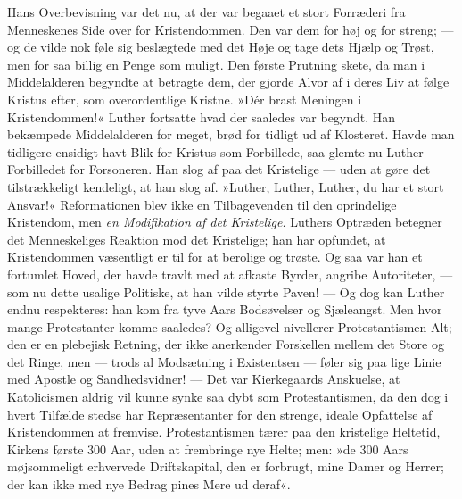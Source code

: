 \documentclass[12pt,a4paper,openany]{book}
\newcommand{\opage}[1]{\marginnote{\footnotesize\textit{[#1]}}}
\begin{document}
Hans Overbevisning var det nu, at der var begaaet
et stort Forræderi fra Menneskenes Side over for Kristendommen.
Den var dem for høj og for streng; --- og de
vilde nok føle sig beslægtede med det Høje og tage dets
Hjælp og Trøst, men for saa billig en Penge som muligt.
Den første Prutning skete, da man i Middelalderen begyndte
at betragte dem, der gjorde Alvor af i deres Liv
at følge Kristus efter, som overordentlige Kristne. »Dér
\opage{139}brast Meningen i Kristendommen!« Luther fortsatte hvad
der saaledes var begyndt. Han bekæmpede Middelalderen
for meget, brød for tidligt ud af Klosteret. Havde man
tidligere ensidigt havt Blik for Kristus som Forbillede,
saa glemte nu Luther Forbilledet for Forsoneren. Han
slog af paa det Kristelige --- uden at gøre det tilstrækkeligt
kendeligt, at han slog af. »Luther, Luther, Luther,
du har et stort Ansvar!« Reformationen blev ikke en
Tilbagevenden til den oprindelige Kristendom, men \textit{en
Modifikation af det Kristelige.} Luthers Optræden betegner
det Menneskeliges Reaktion mod det Kristelige; han har
opfundet, at Kristendommen væsentligt er til for at berolige
og trøste. Og saa var han et fortumlet Hoved,
der havde travlt med at afkaste Byrder, angribe Autoriteter,
--- som nu dette usalige Politiske, at han vilde
styrte Paven! --- Og dog kan Luther endnu respekteres:
han kom fra tyve Aars Bodsøvelser og Sjæleangst. Men
hvor mange Protestanter komme saaledes? Og alligevel
nivellerer Protestantismen Alt; den er en plebejisk Retning,
der ikke anerkender Forskellen mellem det Store
og det Ringe, men --- trods al Modsætning i Existentsen ---
føler sig paa lige Linie med Apostle og Sandhedsvidner! ---
Det var Kierkegaards Anskuelse, at Katolicismen aldrig
vil kunne synke saa dybt som Protestantismen, da den
dog i hvert Tilfælde stedse har Repræsentanter for den
strenge, ideale Opfattelse af Kristendommen at fremvise.
Protestantismen tærer paa den kristelige Heltetid, Kirkens
første 300 Aar, uden at frembringe nye Helte; men:
»de 300 Aars møjsommeligt erhvervede Driftskapital,
den er forbrugt, mine Damer og Herrer; der kan ikke
med nye Bedrag pines Mere ud deraf«.
\end{document}

